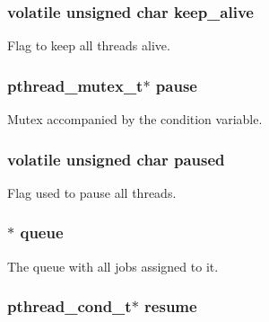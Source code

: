 \subsubsection[{keep\+\_\+alive}]{\setlength{\rightskip}{0pt plus 5cm}volatile unsigned char keep\+\_\+alive}\label{struct_thread___pool_ac24a1c7364475077551efc2e48bda9d0}


Flag to keep all threads alive. 

\hypertarget{struct_thread___pool_a851419414f86abe9a154628d00e5efb4}{}
\subsubsection[{pause}]{\setlength{\rightskip}{0pt plus 5cm}pthread\+\_\+mutex\+\_\+t$\ast$ pause}\label{struct_thread___pool_a851419414f86abe9a154628d00e5efb4}


Mutex accompanied by the condition variable. 

\hypertarget{struct_thread___pool_aa3a3ac301929dcdd75a29d985167d7fa}{}
\subsubsection[{paused}]{\setlength{\rightskip}{0pt plus 5cm}volatile unsigned char paused}\label{struct_thread___pool_aa3a3ac301929dcdd75a29d985167d7fa}


Flag used to pause all threads. 

\hypertarget{struct_thread___pool_ae83721ed927ae7124473880b3b14e3a7}{}
\subsubsection[{queue}]{$\ast$ queue}\label{struct_thread___pool_ae83721ed927ae7124473880b3b14e3a7}


The queue with all jobs assigned to it. 

\hypertarget{struct_thread___pool_a08d1ddc052477bcca8d06a45f336f698}{}
\subsubsection[{resume}]{\setlength{\rightskip}{0pt plus 5cm}pthread\+\_\+cond\+\_\+t$\ast$ resume}\label{struct_thread___pool_a08d1ddc052477bcca8d06a45f336f698}


